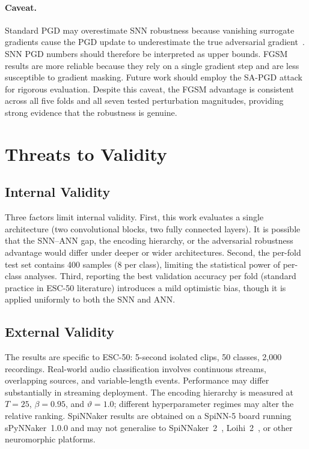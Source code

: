 \paragraph{Caveat.}
Standard PGD may overestimate SNN robustness because vanishing surrogate gradients cause the PGD update to underestimate the true adversarial gradient~\citep{wang2025sapgd}. SNN PGD numbers should therefore be interpreted as upper bounds. FGSM results are more reliable because they rely on a single gradient step and are less susceptible to gradient masking. Future work should employ the SA-PGD attack~\citep{wang2025sapgd} for rigorous evaluation. Despite this caveat, the FGSM advantage is consistent across all five folds and all seven tested perturbation magnitudes, providing strong evidence that the robustness is genuine.

\section{Threats to Validity}
\label{sec:threats}

\subsection{Internal Validity}

Three factors limit internal validity. First, this work evaluates a single architecture (two convolutional blocks, two fully connected layers). It is possible that the SNN--ANN gap, the encoding hierarchy, or the adversarial robustness advantage would differ under deeper or wider architectures. Second, the per-fold test set contains 400 samples (8 per class), limiting the statistical power of per-class analyses. Third, reporting the best validation accuracy per fold (standard practice in ESC-50 literature) introduces a mild optimistic bias, though it is applied uniformly to both the SNN and ANN.

\subsection{External Validity}

The results are specific to ESC-50: 5-second isolated clips, 50 classes, 2{,}000 recordings. Real-world audio classification involves continuous streams, overlapping sources, and variable-length events. Performance may differ substantially in streaming deployment. The encoding hierarchy is measured at $T = 25$, $\beta = 0.95$, and $\vartheta = 1.0$; different hyperparameter regimes may alter the relative ranking. SpiNNaker results are obtained on a SpiNN-5 board running sPyNNaker~1.0.0 and may not generalise to SpiNNaker~2~\citep{mayr2019spinnaker2}, Loihi~2~\citep{davies2018loihi}, or other neuromorphic platforms.

